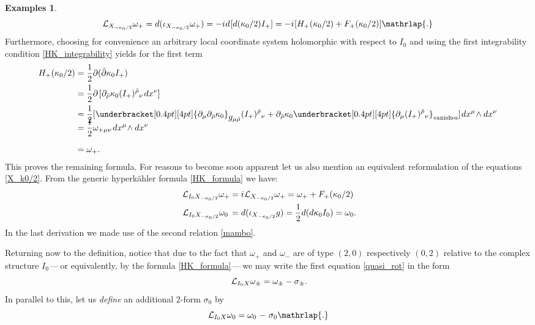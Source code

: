 \documentclass[11pt]{amsart}
\theoremstyle{remark}
\theoremstyle{remark}
\theoremstyle{definition}
\theoremstyle{definition}
\theoremstyle{definition}
\newtheorem*{examples}{Examples}
\newcommand{\0}{{\scriptstyle 0'}} %
\newcommand{\1}{{\scriptstyle 1'}}
\newcommand{\pt}{\hspace{1pt}} %
\newcommand{\hp}{\hspace{0.5pt}} %
\begin{document}
\begin{examples}
\begin{equation}
\mathcal{L}_{X_{-\kappa_0/2}} \omega_+ = d(\iota_{X_{-\kappa_0/2}}\omega_+)  = - i \hp d\hp [d(\kappa_0/2)I_+] = -i \hp [H_+(\kappa_0/2) + F_+(\kappa_0/2) ] \mathrlap{.}
\end{equation}
Furthermore, choosing for convenience an arbitrary local coordinate system holomorphic with respect to $I_0$ and using the first integrability condition \eqref{HK_integrability} yields for the first term 
{\allowdisplaybreaks
\begin{align} \label{H+(K)}
H_+(\kappa_0/2) & = \frac{1}{2} \partial(\bar{\partial}\kappa_0 I_+) \\
& = \frac{1}{2} \partial \pt [ \hp \partial_{\bar{\rho}} \kappa_0 (I_+)^{\bar{\rho}}{}_{\nu} \pt dx^{\nu} ] \nonumber \\
& = \frac{1}{2} [ \underbracket[0.4pt][4pt]{\partial_{\mu}\partial_{\bar{\rho}} \kappa_0}_{\text{\normalsize{$g_{\mu\bar{\rho}}$}} \rule[6pt]{0pt}{0pt}} (I_+)^{\bar{\rho}}{}_{\nu} + \partial_{\bar{\rho}} \kappa_0 \underbracket[0.4pt][4pt]{\partial_{\mu}(I_+)^{\bar{\rho}}{}_{\nu}}_{\text{vanishes}}] \pt dx^{\mu} \!\wedge dx^{\nu} \nonumber \\[-8pt]
& = \frac{1}{2} \omega_{+\mu\nu} \pt dx^{\mu} \!\wedge dx^{\nu} \nonumber \\[6pt]
& = \omega_+ \rlap{.} \nonumber
\end{align}
}%
This proves the remaining formula. For reasons to become soon apparent let us also mention an equivalent reformulation of the equations \eqref{X_k0/2}. From the generic hyperk\"ahler formula \eqref{HK_formula} we have: 
\begin{equation} \label{grad_quasi_rot}
\begin{aligned}
\mathcal{L}_{I_0X_{-\kappa_0/2}} \omega_+ & = i \hp \mathcal{L}_{X_{-\kappa_0/2}} \omega_+ = \omega_+ + F_+(\kappa_0/2) \\
\mathcal{L}_{I_0X_{-\kappa_0/2}} \omega_0 \, & = d(\iota_{X_{-\kappa_0/2}}g) = \frac{1}{2} d(d\kappa_0I_0) = \omega_0 \rlap{.}
\end{aligned}
\end{equation}
In the last derivation we made use of the second relation \eqref{mambo}.

\end{examples}


Returning now to the definition, notice that due to the fact that $\omega_+$ and $\omega_-$ are of type $(2,0)$ respectively $(0,2)$ relative to the complex structure $I_0$\,---\,or equivalently, by the formula \eqref{HK_formula}\,---\,we may write the first equation \eqref{quasi_rot} in the form
\begin{equation} \label{Lolek}
\mathcal{L}_{I_0X}\omega_{\pm} = \omega_{\pm} - \sigma_{\pm} \rlap{.}
\end{equation}
In parallel to this, let us \textit{define} an additional 2-form $\sigma_0$ by 
\begin{equation} \label{Bolek}
\mathcal{L}_{I_0X}\omega_0 = \omega_0 \pt - \pt \sigma_0 \mathrlap{.}
\end{equation}
\end{document}
